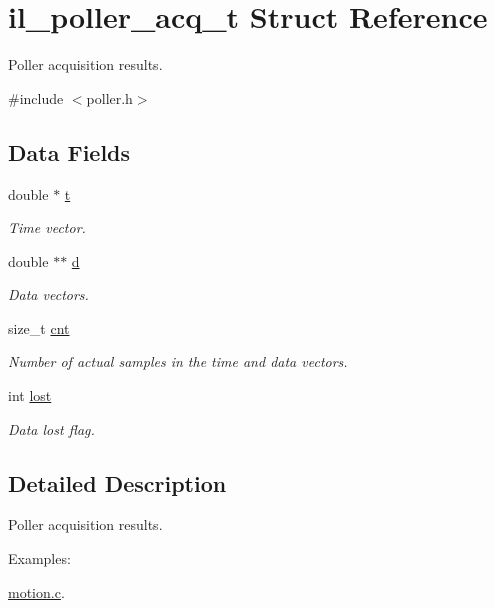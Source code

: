 \hypertarget{structil__poller__acq__t}{}\section{il\+\_\+poller\+\_\+acq\+\_\+t Struct Reference}
\label{structil__poller__acq__t}


Poller acquisition results.  




{\ttfamily \#include $<$poller.\+h$>$}

\subsection*{Data Fields}
\begin{DoxyCompactItemize}
\item 
double $\ast$ \hyperlink{structil__poller__acq__t_aae27ff232752eb21937cefd31c5adcb4}{t}
\begin{DoxyCompactList}\small\item\em Time vector. \end{DoxyCompactList}\item 
double $\ast$$\ast$ \hyperlink{structil__poller__acq__t_aa0c86de89229342ec18f4cf7effdc089}{d}
\begin{DoxyCompactList}\small\item\em Data vectors. \end{DoxyCompactList}\item 
size\+\_\+t \hyperlink{structil__poller__acq__t_aaf726970c22e29aafbbe83d2b24b2eaa}{cnt}
\begin{DoxyCompactList}\small\item\em Number of actual samples in the time and data vectors. \end{DoxyCompactList}\item 
int \hyperlink{structil__poller__acq__t_a41b46fb77cf99d8d2d307e5ec37f707a}{lost}
\begin{DoxyCompactList}\small\item\em Data lost flag. \end{DoxyCompactList}\end{DoxyCompactItemize}


\subsection{Detailed Description}
Poller acquisition results. 

\begin{Desc}
\item[Examples\+: ]\par
\hyperlink{motion_8c-example}{motion.\+c}.\end{Desc}


